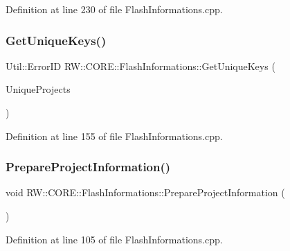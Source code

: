 Definition at line 230 of file Flash\+Informations.\+cpp.

\hypertarget{class_r_w_1_1_c_o_r_e_1_1_flash_informations_aa811fbcf9e0267f0d211d92a0b359c32}{}\label{class_r_w_1_1_c_o_r_e_1_1_flash_informations_aa811fbcf9e0267f0d211d92a0b359c32} 
\subsubsection{\texorpdfstring{Get\+Unique\+Keys()}{GetUniqueKeys()}}
{\footnotesize\ttfamily Util\+::\+Error\+ID R\+W\+::\+C\+O\+R\+E\+::\+Flash\+Informations\+::\+Get\+Unique\+Keys (\begin{DoxyParamCaption}\item[{Q\+List$<$ Q\+String $>$ \&}]{Unique\+Projects }\end{DoxyParamCaption})}



Definition at line 155 of file Flash\+Informations.\+cpp.

\hypertarget{class_r_w_1_1_c_o_r_e_1_1_flash_informations_aa637abd5665ab3253c28b2f56552df4a}{}\label{class_r_w_1_1_c_o_r_e_1_1_flash_informations_aa637abd5665ab3253c28b2f56552df4a} 
\subsubsection{\texorpdfstring{Prepare\+Project\+Information()}{PrepareProjectInformation()}}
{\footnotesize\ttfamily void R\+W\+::\+C\+O\+R\+E\+::\+Flash\+Informations\+::\+Prepare\+Project\+Information (\begin{DoxyParamCaption}{ }\end{DoxyParamCaption})\hspace{0.3cm}{\ttfamily [private]}}



Definition at line 105 of file Flash\+Informations.\+cpp.

\hypertarget{class_r_w_1_1_c_o_r_e_1_1_flash_informations_a02e53be6cd2fddc476129dde406ca241}{}\label{class_r_w_1_1_c_o_r_e_1_1_flash_informations_a02e53be6cd2fddc476129dde406ca241} 
